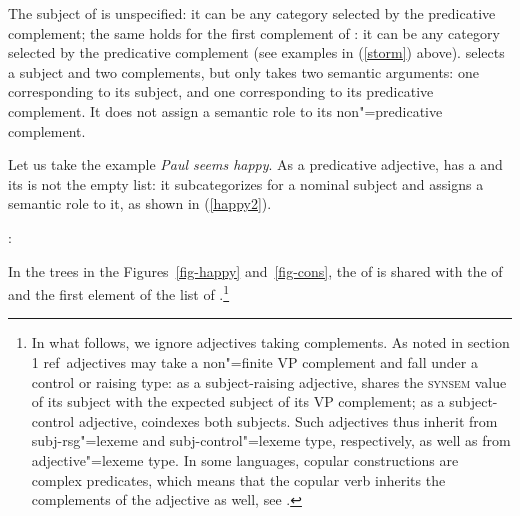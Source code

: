 \documentclass[output=paper
	        ,collection
	        ,collectionchapter
 	        ,biblatex
                ,babelshorthands
                ,newtxmath
                ,draftmode
                ,colorlinks, citecolor=brown
]{langscibook}
\begin{document}
	
The subject of  is unspecified: it can be any category selected by the predicative
complement; the same holds for the first complement of :
it can be any category
selected by the predicative complement (see examples in (\ref{storm}) above).   selects
a subject and two complements, but only takes two semantic arguments: one corresponding to its
subject, and one corresponding to its predicative complement. It does not assign a semantic role to
its non"=predicative complement.

Let us take the example \textit{Paul seems happy}. As a predicative adjective,  has a
\headf [\prd $+$] and its \subjf is not the empty list: it subcategorizes for a nominal subject and
assigns a semantic role to it, as shown in (\ref{happy2}).
	
\eas
\label{happy2}
:\\
\zs

In the trees in the Figures~\ref{fig-happy} and~\ref{fig-cons}, the \subjf of  is
shared with the \subjf of  and the first element of the \comps list of
.\footnote{In what follows, we ignore adjectives taking complements. As noted in section 1 ref\, adjectives may take a non"=finite VP complement and fall under a control or raising type: as a subject-raising adjective,  shares the \textsc{synsem} value of its subject with the expected subject of its VP complement; as a subject-control adjective,  coindexes both subjects.
Such adjectives thus inherit from subj-rsg"=lexeme and subj-control"=lexeme type, respectively, as well as from adjective"=lexeme type. In some languages, copular constructions are complex predicates, which means that the copular verb inherits the complements of the adjective as well, see .}
\end{document}
